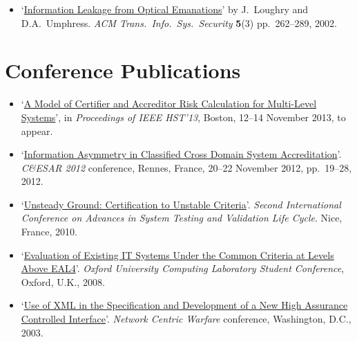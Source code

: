 \documentclass[12pt,letterpaper]{article}
\begin{document}
\begin{itemize}
    \item `\href{http://dl.acm.org/citation.cfm?doid=545186.545189}{Information Leakage
	from Optical Emanations}' by J.\ Loughry and D.A.\ Umphress. \emph{ACM
	Trans.\ Info.\ Sys.\ Security} \textbf{5}(3) pp.\ 262--289, 2002.
\end{itemize}

\vspace{-8mm}
\section*{Conference Publications}

\begin{itemize}
	\item `\href{http://ieee-hst.org/agenda/papers/papers_sched.html#cyber4}{A Model of
		Certifier and Accreditor Risk Calculation for Multi-Level Systems}', in
		\emph{Proceedings of IEEE HST'13}, Boston, 12--14 November 2013, to appear.

	\item `\href{http://applied-math.org/CESAR2012_information_asymmetry.pdf}{Information
		Asymmetry in Classified Cross Domain System Accreditation}'. \emph{C\&ESAR 2012}
		conference, Rennes, France, 20--22 November 2012, pp.\ 19--28, 2012.

	\item `\href{http://ieeexplore.ieee.org/xpls/abs_all.jsp?arnumber=5617171&tag=1}{Unsteady
		Ground: Certification to Unstable Criteria}'. \emph{Second International Conference
		on Advances in System Testing and Validation Life Cycle}. Nice, France, 2010. 

	\item `\href{http://www.cs.ox.ac.uk/files/1328/RR-08-10.pdf}{Evaluation of Existing IT
		Systems Under the Common Criteria at Levels Above EAL4}'. \emph{Oxford University
		Computing Laboratory Student Conference}, Oxford, U.K., 2008.

    \item `\href{https://docs.google.com/viewer?a=v&q=cache:OjDo4H9Pj10J:citeseerx.ist.psu.edu/viewdoc/download%3Fdoi%3D10.1.1.10.4531%26rep%3Drep1%26type%3Dpdf+&hl=en&gl=uk&pid=bl&srcid=ADGEESgzzne2bVzWsUDU4ITF7lKKcGhA_k51PqkEVB7aiZgGgJ65C9VGGFIDIL2TQ_YUcdDO20UNkw-mnwZN71u0JDy5EYltrpjR_If5ZU8yyXc400Izs9ywtAeLkxHyxd02fNek-mj4&sig=AHIEtbQHRLT1rO3Eft0-P1LmHBrZ7zJL7w}{Use
		of XML in the Specification and Development of a New High Assurance Controlled Interface}'.
		\emph{Network Centric Warfare} conference, Washington, D.C., 2003.


\end{itemize}
\end{document}
